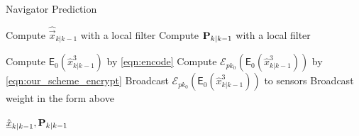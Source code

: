 \begin{algorithm}[htbp]
\caption{Navigator Prediction}\label{alg:nav_prediction}
\begin{algorithmic}[1]
    \State Compute $\hat{\vec{x}}_{k|k-1}$ with a local filter
    \State Compute ${{\mathbf{P}}}_{k|k-1}$ with a local filter

    \State Compute $\mathsf{E}_{0}(\hat{x}^3_{k|k-1})$ by \eqref{eqn:encode}
    \State Compute $\mathcal{E}_{pk_0}(\mathsf{E}_{0}(\hat{x}^3_{k|k-1}))$ by \eqref{eqn:our_scheme_encrypt}
    \State Broadcast $\mathcal{E}_{pk_0}(\mathsf{E}_{0}(\hat{x}^3_{k|k-1}))$ to sensors
        \State Broadcast weight in the form above
    \EndFor

    \State \Return $\hat{{\underline{x}}}_{k|k-1}, {{\mathbf{P}}}_{k|k-1}$
    \EndProcedure
\end{algorithmic}
\end{algorithm}

